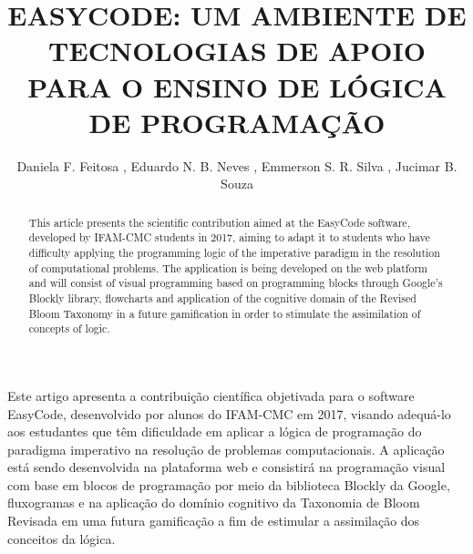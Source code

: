 \documentclass[12pt]{article}
\title{EASYCODE: UM AMBIENTE DE TECNOLOGIAS DE APOIO PARA O ENSINO DE LÓGICA DE PROGRAMAÇÃO}
\author{Daniela F. Feitosa \inst{1}, Eduardo N. B. Neves \inst{1}, Emmerson S. R. Silva \inst{1}, Jucimar B. Souza \inst{1}}
\begin{document}
 

\maketitle

\begin{abstract}
This article presents the scientific contribution aimed at the EasyCode software, developed by IFAM-CMC students in 2017, aiming to adapt it to students who have difficulty applying the programming logic of the imperative paradigm in the resolution of computational problems. The application is being developed on the web platform and will consist of visual programming based on programming blocks through Google's Blockly library, flowcharts and application of the cognitive domain of the Revised Bloom Taxonomy \cite{ANDERSON:2001} in a future gamification in order to stimulate the assimilation of concepts of logic.

\end{abstract}
     
\begin{resumo}
Este artigo apresenta a contribuição científica objetivada para o software EasyCode, desenvolvido por alunos do IFAM-CMC em 2017, visando adequá-lo aos estudantes que têm dificuldade em aplicar a lógica de programação do paradigma imperativo na resolução de problemas computacionais. A aplicação está sendo desenvolvida na plataforma web e consistirá na programação visual com base em blocos de programação por meio da biblioteca Blockly da Google, fluxogramas e na aplicação do domínio cognitivo da Taxonomia de Bloom Revisada \cite{ANDERSON:2001} em uma futura gamificação a fim de estimular a assimilação dos conceitos da lógica.
\end{resumo}
\end{document}

